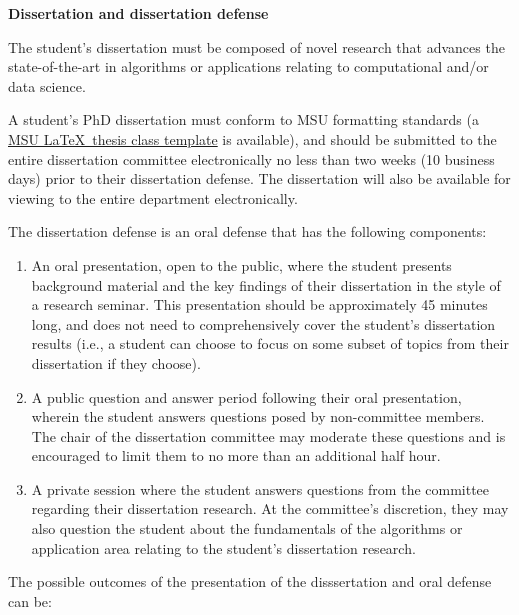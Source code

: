 \vspace{3mm}
\noindent
\textbf{Dissertation and dissertation defense}

The student's dissertation must be composed of novel research that
advances the state-of-the-art in algorithms or applications relating
to computational and/or data science.

A student's PhD dissertation must conform to MSU formatting standards
(a \href{http://ctan.org/pkg/msu-thesis}{MSU \LaTeX\ thesis class
  template} is available), and should be submitted to the entire
dissertation committee electronically no less than two weeks (10 business days) prior to
their dissertation defense.  The dissertation will also be available for
viewing to the entire department electronically.

The dissertation defense is an oral defense that has the following
components:

\begin{enumerate}

\item An oral presentation, open to the public, where the student
  presents background material and the key findings of their
  dissertation in the style of a research seminar.  This presentation
  should be approximately 45 minutes long, and does not need to
  comprehensively cover the student's dissertation results (i.e., a
  student can choose to focus on some subset of topics from their
  dissertation if they choose).

\item A public question and answer period following their oral
  presentation, wherein the student answers questions posed by
  non-committee members.  The chair of the dissertation committee may
  moderate these questions and is encouraged to limit them to no more
  than an additional half hour.

\item A private session where the student answers questions from the
  committee regarding their dissertation research.  At the committee's
  discretion, they may also question the student about the
  fundamentals of the algorithms or application area relating to the
  student's dissertation research.

\end{enumerate}

The possible outcomes of the presentation of the disssertation and oral defense can be:

